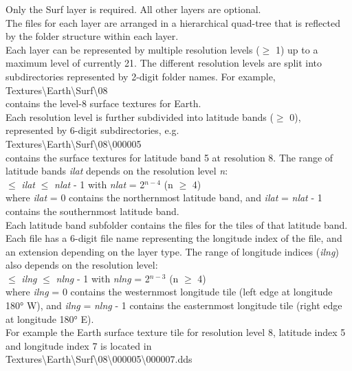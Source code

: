 \documentclass[Orbiter Developer Manual.tex]{subfiles}
\begin{document}
\noindent
Only the Surf layer is required. All other layers are optional.\\
The files for each layer are arranged in a hierarchical quad-tree that is reflected by the folder structure within each layer.\\
Each layer can be represented by multiple resolution levels ($\geq$ 1) up to a maximum level of currently 21. The different resolution levels are split into subdirectories represented by 2-digit folder names. For example,\\
\indent Textures\textbackslash Earth\textbackslash Surf\textbackslash 08\\
contains the level-8 surface textures for Earth.\\
Each resolution level is further subdivided into latitude bands ($\geq$ 0), represented by 6-digit subdirectories, e.g.\\
\indent Textures\textbackslash Earth\textbackslash Surf\textbackslash 08\textbackslash 000005\\
contains the surface textures for latitude band 5 at resolution 8. The range of latitude bands \textit{ilat} depends on the resolution level \textit{n}:\\
 $\leq$ \textit{ilat} $\leq$ \textit{nlat} - 1  with  \textit{nlat} = 2$^{n-4}$  (n $\geq$ 4)\\
where \textit{ilat} = 0 contains the northernmost latitude band, and \textit{ilat} = \textit{nlat} - 1 contains the southernmost latitude band.\\
Each latitude band subfolder contains the files for the tiles of that latitude band. Each file has a 6-digit file name representing the longitude index of the file, and an extension depending on the layer type. The range of longitude indices (\textit{ilng}) also depends on the resolution level:\\
 $\leq$ \textit{ilng} $\leq$ \textit{nlng} - 1  with  \textit{nlng} = 2$^{n-3}$  (n $\geq$ 4)\\
where \textit{ilng} = 0 contains the westernmost longitude tile (left edge at longitude 180° W), and \textit{ilng} = \textit{nlng} - 1 contains the easternmost longitude tile (right edge at longitude 180° E).\\
For example the Earth surface texture tile for resolution level 8, latitude index 5 and longitude index 7 is located in\\
\indent Textures\textbackslash Earth\textbackslash Surf\textbackslash 08\textbackslash 000005\textbackslash 000007.dds
\end{document}
